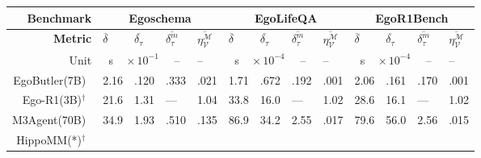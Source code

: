 \begin{table}[htbp]
    \centering
    \fontsize{7}{10}\selectfont
    \setlength{\tabcolsep}{6pt}
    \renewcommand{\arraystretch}{1.4}
    \begin{tabular}{r|p{0.4cm}<{\centering}p{0.4cm}<{\centering}p{0.4cm}<{\centering}p{0.4cm}<{\centering}|p{0.4cm}<{\centering}p{0.4cm}<{\centering}p{0.4cm}<{\centering}p{0.4cm}<{\centering}|p{0.4cm}<{\centering}p{0.4cm}<{\centering}p{0.4cm}<{\centering}p{0.4cm}<{\centering}}
        \textbf{Benchmark} &
            \multicolumn{4}{c|}{\fontsize{9}{12}\selectfont Egoschema} &
            \multicolumn{4}{c|}{\fontsize{9}{12}\selectfont EgoLifeQA} &
            \multicolumn{4}{c}{\fontsize{9}{12}\selectfont EgoR1Bench}\\ \hline \hline
        \textbf{Metric} 
        & $\overline{\delta}$ & $\overline{\delta_\tau}$ & $\overline{\delta^m_\tau}$ & $\overline{\eta^{\mathcal{M}}_{\mathcal{V}}}$
        & $\overline{\delta}$ & $\overline{\delta_\tau}$ & $\overline{\delta^m_\tau}$ & $\overline{\eta^{\mathcal{M}}_{\mathcal{V}}}$
        & $\overline{\delta}$ & $\overline{\delta_\tau}$ & $\overline{\delta^m_\tau}$ & $\overline{\eta^{\mathcal{M}}_{\mathcal{V}}}$
        \\
        Unit 
        & \multicolumn{3}{c}{s$\quad \times10^{-1} \quad $ --} & --
        & \multicolumn{3}{c}{s$\quad \times10^{-4} \quad $ --} & --
        & \multicolumn{3}{c}{s$\quad \times10^{-4} \quad $ --} & --
        \\
        \hline
        EgoButler(7B)~\cite{yang2025EgoLife}
        & 2.16\cellcolor{first!60} & .120\cellcolor{first!60} & .333\cellcolor{first!60}  & .021\cellcolor{first!60}
        & 1.71\cellcolor{first!60} & .672\cellcolor{first!60} & .192\cellcolor{second!60} & .001\cellcolor{first!60}
        & 2.06\cellcolor{first!60} & .161\cellcolor{first!60} & .170\cellcolor{second!60} & .001\cellcolor{first!60}
        \\
        Ego-R1(3B)$^{\dag}$~\cite{tian2025EgoR1}
        & 21.6 & 1.31 & --- & 1.04
        & 33.8\cellcolor{third!60} & 16.0\cellcolor{third!60} & --- & 1.02
        & 28.6\cellcolor{third!60} & 16.1\cellcolor{third!60} & --- & 1.02
        \\
        M3Agent(70B)~\cite{long2025M3Agent}
        & 34.9 & 1.93 & .510 & .135\cellcolor{third!60}
        & 86.9 & 34.2 & 2.55 & .017\cellcolor{second!60}
        & 79.6 & 56.0 & 2.56 & .015\cellcolor{second!60}
        \\
        HippoMM(*)$^{\dag}$~\cite{lin2025HippoMM}

\end{tabular}
\end{table}
